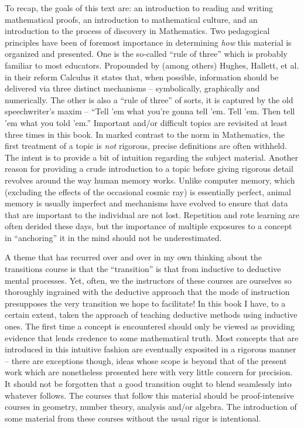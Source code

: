 To recap, the goals of this text are: an introduction to reading and
writing mathematical proofs, an introduction to mathematical culture,
and an introduction to the process of discovery in Mathematics.  Two
pedagogical principles have been of foremost importance in determining
{\em how} this material is organized and presented.  One is the
so-called ``rule of three'' which is probably familiar to most
educators.  Propounded by (among others) Hughes, Hallett, et al. in their
reform Calculus it states that, when possible, information should be
delivered via three distinct mechanisms -- symbolically, graphically and
numerically.  The other is also a ``rule of three'' of sorts, it is captured by
the old speechwriter's maxim -- ``Tell 'em what you're gonna tell 'em.
Tell 'em.  Then tell 'em what you told 'em.''  Important and/or difficult
topics are revisited at least three times in this book.  In marked contrast to
the norm in Mathematics, the first treatment of a topic is {\em not}
rigorous, precise definitions are often withheld.  The intent is to
provide a bit of intuition regarding the subject material.  Another
reason for providing a crude introduction to a topic before giving
rigorous detail revolves around the way human memory works.  Unlike
computer memory, which (excluding the effects of the occasional
cosmic ray) is essentially perfect, animal memory is usually imperfect
and mechanisms have evolved to ensure that data that are important to
the individual are not lost.  Repetition and rote learning are often
derided these days, but the importance of multiple exposures to a
concept in ``anchoring'' it in the mind should not be underestimated. 

A theme that has recurred over and over in my own thinking about
the transitions course is that the ``transition'' is that from inductive
to deductive mental processes.  Yet, often, we the instructors of these courses
are ourselves so thoroughly ingrained with the deductive approach
that the mode of instruction presupposes the very transition we 
hope to facilitate!  In this book I have, to a certain extent, 
taken the approach of
teaching deductive methods using inductive ones.  The first 
time a concept is encountered should only be viewed as providing
evidence that lends credence to some mathematical truth.  Most 
concepts that are introduced in this intuitive fashion are eventually
exposited in a rigorous manner -- there are exceptions though, ideas
whose scope is beyond that of the present work which are nonetheless
presented here with very little concern for precision.  It should
not be forgotten that a good transition ought to blend seamlessly 
into whatever follows.  The courses that follow this material 
should be proof-intensive courses in geometry, number theory, 
analysis and/or algebra.
The introduction of some material from these courses without the
usual rigor is intentional. 

